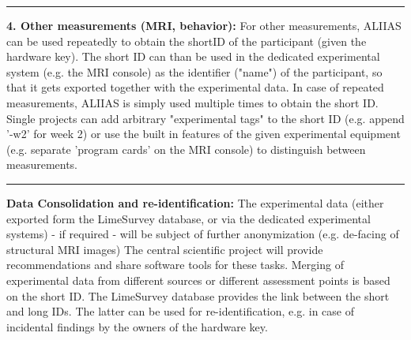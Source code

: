  \par\noindent\rule{\textwidth\color{pniblue}}{0.4pt}
 \textbf{4. Other measurements (MRI, behavior):}
 For other measurements, ALIIAS can be used repeatedly to obtain the shortID of the participant (given the hardware key). The short ID can than be used in the dedicated experimental system (e.g. the MRI console) as the identifier ("name") of the participant, so that it gets exported together with the experimental data. In case of repeated measurements, ALIIAS is simply used multiple times to obtain the short ID. Single projects can add arbitrary "experimental tags" to the short ID (e.g. append '-w2' for week 2) or use the built in features of the given experimental equipment (e.g. separate 'program cards' on the MRI console) to distinguish between measurements.

\par\noindent\rule{\textwidth\color{pniblue}}{0.4pt}
\textbf{Data Consolidation and re-identification:} The experimental data (either exported form the LimeSurvey database, or via the dedicated experimental systems) - if required - will be subject of further anonymization (e.g. de-facing of structural MRI images) The central scientific project will provide recommendations and share software tools for these tasks. Merging of experimental data from different sources or different assessment points is based on the short ID. The LimeSurvey database provides the link between the short and long IDs. The latter can be used for re-identification, e.g. in case of incidental findings by the owners of the hardware key.